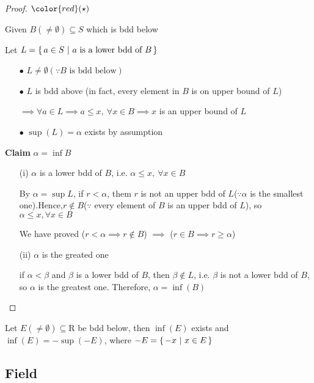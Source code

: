 \begin{proof}$\color{red}(\star)$

	Given $B(\neq \emptyset) \subseteq S$ which is bdd below
	
	Let $L = \left\{ \,a \in S ~|~ a \text{ is a lower bdd of }B \,\right\}$
	
	\begin{enumerate}
		\item[$\bullet$] $L \neq \emptyset(\because B\text{ is bdd below})$
		\item[$\bullet$] $L$ is bdd above (in fact, every element in $B$ is on upper bound of $L$)
		
		$\implies \forall a \in L \implies a \leq x ,~\forall x \in B \implies x$ is an upper bound of $L$ 
		\item[$\bullet$] $\sup (L) = \alpha$ exists by assumption
		
	\end{enumerate}
	
	\textbf{Claim} $\alpha = \inf B$
	
	\begin{enumerate}
		\item[(i)] $\alpha$ is a lower bdd of $B$, i.e. $\alpha \leq x,~\forall x \in B$
		
		By $\alpha = \sup L$, if $r < \alpha$, them $r$ is not an upper bdd of $L$($\because \alpha$ is the smallest one).Hence,$r \notin B$($\because$ every element of $B$ is an upper bdd of $L$), so $\alpha \leq x, \forall x \in B$ 
		
		We have proved ($r<\alpha \implies r \notin B$) $\implies$ ($r\in B \implies r \geq \alpha$)
		\item[(ii)] $\alpha$ is the greated one
		
		if $\alpha < \beta$ and $\beta$ is a lower bdd of $B$, then $\beta \notin L$, i.e. $\beta$ is not a lower bdd of $B$, so $\alpha$ is the greatest one. Therefore, $\alpha = \inf (B)$
	\end{enumerate}
	
\end{proof}

\begin{rmk*}
	Let $E(\neq \emptyset) \subseteq \mathrm{R}$ be bdd below, then $\inf (E)$ exists and $\inf(E) = -\sup(-E)$, where $-E = \left\{ \,-x ~|~x \in E \,\right\}$
\end{rmk*}

\subsection{Field} $ $
 
